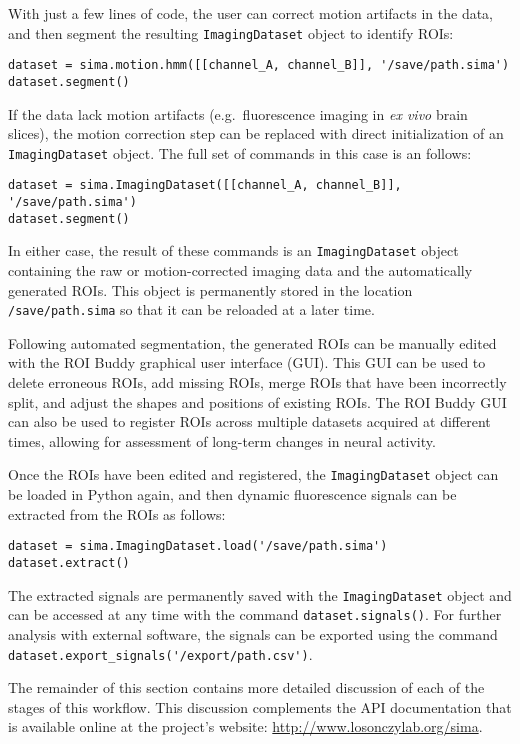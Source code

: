 With just a few lines of code, the user can correct motion artifacts in the data,
and then segment the resulting \verb|ImagingDataset| object to identify 
ROIs:
\begin{verbatim}
dataset = sima.motion.hmm([[channel_A, channel_B]], '/save/path.sima')
dataset.segment()
\end{verbatim}
If the data lack motion artifacts (e.g.\ fluorescence imaging in \textit{ex vivo} brain slices), 
the motion correction step can be replaced with direct initialization of an
\verb|ImagingDataset| object.
The full set of commands in this case is an follows:
\begin{verbatim}
dataset = sima.ImagingDataset([[channel_A, channel_B]], '/save/path.sima')
dataset.segment()
\end{verbatim}
In either case, the result of these commands is an \verb|ImagingDataset| object
containing the raw or motion-corrected imaging data and the automatically
generated ROIs.
This object is permanently stored in the location \verb|/save/path.sima|
so that it can be reloaded at a later time.

Following automated segmentation, the generated ROIs can be manually edited with the ROI Buddy graphical user interface (GUI).
This GUI can be used to delete erroneous ROIs, add missing ROIs, merge ROIs that have been incorrectly split, and adjust the shapes and positions of existing ROIs.
The ROI Buddy GUI can also be used to register ROIs across multiple datasets acquired at different times, 
allowing for assessment of long-term changes in neural activity.

Once the ROIs have been edited and registered,
the \verb|ImagingDataset| object can be loaded in Python again,
and then dynamic fluorescence signals can be extracted from the ROIs as follows:
\begin{verbatim}
dataset = sima.ImagingDataset.load('/save/path.sima')
dataset.extract()
\end{verbatim}
The extracted signals are permanently saved with the \verb|ImagingDataset| object and can be accessed at any time with the command \verb|dataset.signals()|.
For further analysis with external software, the signals can be exported using the command \verb|dataset.export_signals('/export/path.csv')|.

The remainder of this section contains more detailed discussion of each of the 
stages of this workflow.
This discussion complements the API documentation that is available online at the project's website: \url{http://www.losonczylab.org/sima}.

